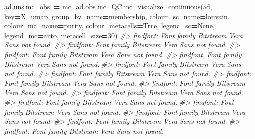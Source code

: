 \documentclass[
]{book}
\newenvironment{Shaded}{\begin{snugshade}}{\end{snugshade}}
\newcommand{\CommentTok}[1]{\textcolor[rgb]{0.56,0.35,0.01}{\textit{#1}}}
\newcommand{\DecValTok}[1]{\textcolor[rgb]{0.00,0.00,0.81}{#1}}
\newcommand{\NormalTok}[1]{#1}
\newcommand{\OperatorTok}[1]{\textcolor[rgb]{0.81,0.36,0.00}{\textbf{#1}}}
\newcommand{\StringTok}[1]{\textcolor[rgb]{0.31,0.60,0.02}{#1}}
\newcommand{\VariableTok}[1]{\textcolor[rgb]{0.00,0.00,0.00}{#1}}
\begin{document}
\begin{Shaded}
\begin{Highlighting}[]
\NormalTok{ad.uns[}\StringTok{\textquotesingle{}mc\_obs\textquotesingle{}}\NormalTok{] }\OperatorTok{=}\NormalTok{ mc\_ad.obs}
\NormalTok{mc\_QC.mc\_visualize\_continuous(ad, key}\OperatorTok{=}\StringTok{\textquotesingle{}X\_umap\textquotesingle{}}\NormalTok{, group\_by\_name}\OperatorTok{=}\StringTok{\textquotesingle{}membership\textquotesingle{}}\NormalTok{, }
\NormalTok{             colour\_sc\_name}\OperatorTok{=}\StringTok{\textquotesingle{}louvain\textquotesingle{}}\NormalTok{,  colour\_mc\_name}\OperatorTok{=}\StringTok{\textquotesingle{}purity\textquotesingle{}}\NormalTok{, colour\_metacells}\OperatorTok{=}\VariableTok{True}\NormalTok{,}
\NormalTok{             legend\_sc}\OperatorTok{=}\VariableTok{None}\NormalTok{, legend\_mc}\OperatorTok{=}\StringTok{\textquotesingle{}auto\textquotesingle{}}\NormalTok{, metacell\_size}\OperatorTok{=}\DecValTok{30}\NormalTok{)}
\CommentTok{\#\textgreater{} findfont: Font family \textquotesingle{}Bitstream Vera Sans\textquotesingle{} not found.}
\CommentTok{\#\textgreater{} findfont: Font family \textquotesingle{}Bitstream Vera Sans\textquotesingle{} not found.}
\CommentTok{\#\textgreater{} findfont: Font family \textquotesingle{}Bitstream Vera Sans\textquotesingle{} not found.}
\CommentTok{\#\textgreater{} findfont: Font family \textquotesingle{}Bitstream Vera Sans\textquotesingle{} not found.}
\CommentTok{\#\textgreater{} findfont: Font family \textquotesingle{}Bitstream Vera Sans\textquotesingle{} not found.}
\CommentTok{\#\textgreater{} findfont: Font family \textquotesingle{}Bitstream Vera Sans\textquotesingle{} not found.}
\CommentTok{\#\textgreater{} findfont: Font family \textquotesingle{}Bitstream Vera Sans\textquotesingle{} not found.}
\CommentTok{\#\textgreater{} findfont: Font family \textquotesingle{}Bitstream Vera Sans\textquotesingle{} not found.}
\CommentTok{\#\textgreater{} findfont: Font family \textquotesingle{}Bitstream Vera Sans\textquotesingle{} not found.}
\CommentTok{\#\textgreater{} findfont: Font family \textquotesingle{}Bitstream Vera Sans\textquotesingle{} not found.}
\CommentTok{\#\textgreater{} findfont: Font family \textquotesingle{}Bitstream Vera Sans\textquotesingle{} not found.}
\CommentTok{\#\textgreater{} findfont: Font family \textquotesingle{}Bitstream Vera Sans\textquotesingle{} not found.}
\CommentTok{\#\textgreater{} findfont: Font family \textquotesingle{}Bitstream Vera Sans\textquotesingle{} not found.}
\CommentTok{\#\textgreater{} findfont: Font family \textquotesingle{}Bitstream Vera Sans\textquotesingle{} not found.}

\end{Highlighting}
\end{Shaded}
\end{document}
